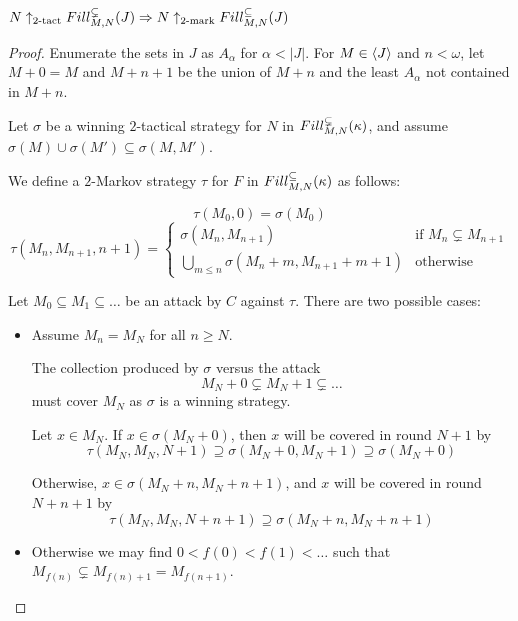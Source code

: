   \begin{theorem}
    $N\uparrow_{2\text{-tact}}Fill^{\subsetneq}_{M,N}(J) \Rightarrow N\uparrow_{2\text{-mark}}Fill^{\subseteq}_{M,N}(J)$
  \end{theorem}

  \begin{proof}
    Enumerate the sets in $J$ as $A_\alpha$ for $\alpha<|J|$. For $M\in \langle J\rangle$ and $n<\omega$, let $M+0=M$ and $M+n+1$ be the union of $M+n$ and the least $A_\alpha$ not contained in $M+n$.

    Let $\sigma$ be a winning $2$-tactical strategy for $N$ in $Fill^{\subsetneq}_{M,N}(\kappa)$, and assume $\sigma(M)\cup\sigma(M')\subseteq\sigma(M,M')$.

    We define a $2$-Markov strategy $\tau$ for $F$ in $Fill^{\subseteq}_{M,N}(\kappa)$ as follows:

      \[
        \tau(M_0,0) = \sigma(M_0)
      \]
      \[
        \tau(M_{n},M_{n+1},n+1) = \left\{
          \begin{array}{ll}
            \sigma(M_{n},M_{n+1}) & \text{if } M_n\subsetneq M_{n+1} \\
            \bigcup_{m\leq n}\sigma(M_n+m,M_{n+1}+m+1) & \text{otherwise}
          \end{array}
        \right.
      \]

    Let $M_0 \subseteq M_1 \subseteq \dots$ be an attack by $C$ against $\tau$. There are two possible cases:

      \begin{itemize}
        \item
          Assume $M_n=M_N$ for all $n\geq N$.

          The collection produced by $\sigma$ versus the attack
            \[
              M_N+0 \subsetneq M_N+1 \subsetneq \dots
            \] 
          must cover $M_N$ as $\sigma$ is a winning strategy.

          Let $x \in M_N$. If $x\in\sigma(M_N+0)$, then $x$ will be covered in round $N+1$ by 
            \[
              \tau(M_N,M_N,N+1)
              \supseteq \sigma(M_N+0,M_N+1)
              \supseteq \sigma(M_N+0)
            \]

          Otherwise, $x\in\sigma(M_N+n,M_N+n+1)$, and $x$ will be covered in round $N+n+1$ by 
            \[
              \tau(M_N,M_N,N+n+1)
              \supseteq \sigma(M_N+n,M_N+n+1)
            \]

        \item
          Otherwise we may find $0<f(0)<f(1)<\dots$ such that $M_{f(n)}\subsetneq M_{f(n)+1}=M_{f(n+1)}$.


\end{itemize}
\end{proof}

